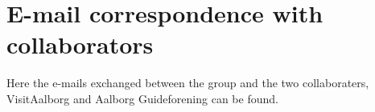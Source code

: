 \chapter{E-mail correspondence with collaborators}\label{app:guide_emails}
Here the e-mails exchanged between the group and the two collaboraters, VisitAalborg and Aalborg Guideforening can be found.



